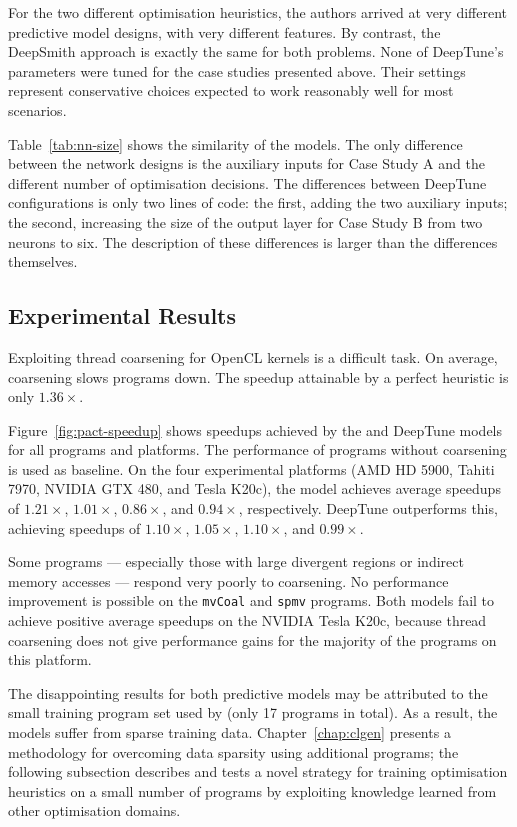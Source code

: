 For the two different optimisation heuristics, the authors arrived at very different predictive model designs, with very different features. By contrast, the DeepSmith approach is exactly the same for both problems. None of DeepTune's parameters were tuned for the case studies presented above. Their settings represent conservative choices expected to work reasonably well for most scenarios.

Table~\ref{tab:nn-size} shows the similarity of the models. The only difference between the network designs is the auxiliary inputs for Case Study A and the different number of optimisation decisions. The differences between DeepTune configurations is only two lines of code: the first, adding the two auxiliary inputs; the second, increasing the size of the output layer for Case Study B from two neurons to six. The description of these differences is larger than the differences themselves.




\subsection{Experimental Results}

Exploiting thread coarsening for OpenCL kernels is a difficult task. On average, coarsening slows programs down. The speedup attainable by a perfect heuristic is only $1.36\times$.

Figure~\ref{fig:pact-speedup} shows speedups achieved by the \citeauthor{Magni2014}and DeepTune models for all programs and platforms. The performance of programs without coarsening is used as baseline. On the four experimental platforms (AMD HD 5900, Tahiti 7970, NVIDIA GTX 480, and Tesla K20c), the \citeauthor{Magni2014}model achieves average speedups of $1.21\times$, $1.01\times$, $0.86\times$, and $0.94\times$, respectively. DeepTune outperforms this, achieving speedups of $1.10\times$, $1.05\times$, $1.10\times$, and $0.99\times$.

Some programs --- especially those with large divergent regions or indirect memory accesses --- respond very poorly to coarsening. No performance improvement is possible on the \texttt{mvCoal} and \texttt{spmv} programs. Both models fail to achieve positive average speedups on the NVIDIA Tesla K20c, because thread coarsening does not give performance gains for the majority of the programs on this platform.

The disappointing results for both predictive models may be attributed to the small training program set used by \citeauthor{Magni2014}(only 17 programs in total). As a result, the models suffer from sparse training data. Chapter~\ref{chap:clgen} presents a methodology for overcoming data sparsity using additional programs; the following subsection describes and tests a novel strategy for training optimisation heuristics on a small number of programs by exploiting knowledge learned from other optimisation domains.


